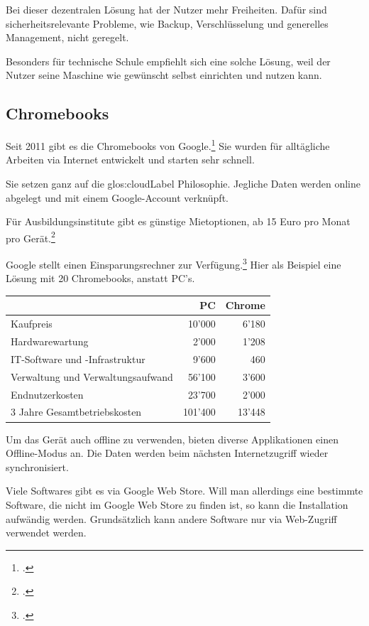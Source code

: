 Bei dieser dezentralen Lösung hat der Nutzer mehr Freiheiten. Dafür sind sicherheitsrelevante Probleme, wie Backup, Verschlüsselung und generelles Management, nicht geregelt.

Besonders für technische Schule empfiehlt sich eine solche Lösung, weil der Nutzer seine Maschine wie gewünscht selbst einrichten und nutzen kann.

\subsection{Chromebooks}
Seit 2011 gibt es die Chromebooks von Google.\footcite{Chromebooks_bersicht_2014-12-27}
Sie wurden für alltägliche Arbeiten via Internet entwickelt und starten sehr schnell.

Sie setzen ganz auf die \Gls{glos:cloudLabel} Philosophie. Jegliche Daten werden online abgelegt und mit einem Google-Account verknüpft.

Für Ausbildungsinstitute gibt es günstige Mietoptionen, ab 15 Euro pro Monat pro Gerät.\footcite{Chromebook_Wikipedia_2014-12-27}

Google stellt einen Einsparungsrechner zur Verfügung.\footcite{Chromebooks_und_Chromeboxes_for_Education_2014-12-27}
Hier als Beispiel eine Lösung mit 20 Chromebooks, anstatt PC's.

\begin{table}[hb]
	\centering
	\small\renewcommand{\arraystretch}{1.4}

	\begin{tabular}{lrr}
		\hline
		\rowcolor{tableheadcolor}
		 & PC & Chrome \\
		\hline
		Kaufpreis & 10'000 & 6'180\\
		Hardwarewartung & 2'000 & 1'208\\
		IT-Software und -Infrastruktur & 9'600 & 460\\
		Verwaltung und Verwaltungsaufwand & 56'100 & 3'600\\
		Endnutzerkosten & 23'700 & 2'000\\
		3 Jahre Gesamtbetriebskosten & 101'400 & 13'448\\
		\hline
	\end{tabular}
\end{table}

Um das Gerät auch offline zu verwenden, bieten diverse Applikationen einen Offline-Modus an. Die Daten werden beim nächsten Internetzugriff wieder synchronisiert.

Viele Softwares gibt es via Google Web Store. Will man allerdings eine bestimmte Software, die nicht im Google Web Store zu finden ist, so kann die Installation aufwändig werden.
Grundsätzlich kann andere Software nur via Web-Zugriff verwendet werden.
